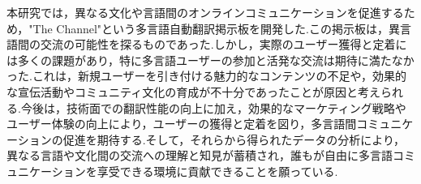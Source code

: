 \documentclass[b5paper,12pt,dvipdfmx]{jsreport}
\begin{document}
本研究では，異なる文化や言語間のオンラインコミュニケーションを促進するため，"The Channel"という多言語自動翻訳掲示板を開発した.この掲示板は，異言語間の交流の可能性を探るものであった.しかし，実際のユーザー獲得と定着には多くの課題があり，特に多言語ユーザーの参加と活発な交流は期待に満たなかった.これは，新規ユーザーを引き付ける魅力的なコンテンツの不足や，効果的な宣伝活動やコミュニティ文化の育成が不十分であったことが原因と考えられる.今後は，技術面での翻訳性能の向上に加え，効果的なマーケティング戦略やユーザー体験の向上により，ユーザーの獲得と定着を図り，多言語間コミュニケーションの促進を期待する.そして，それらから得られたデータの分析により，異なる言語や文化間の交流への理解と知見が蓄積され，誰もが自由に多言語コミュニケーションを享受できる環境に貢献できることを願っている.

\makeatletter
    \renewcommand\@biblabel[1]{}
    \let\oldthebibliography\thebibliography
    \renewcommand{\thebibliography}[1]{%
        \oldthebibliography{#1}%
        \setlength{\itemindent}{-2em}%
        \setlength{\leftmargin}{2em}%
        \setlength{\labelsep}{0em}%
    }
\makeatother
\end{document}
